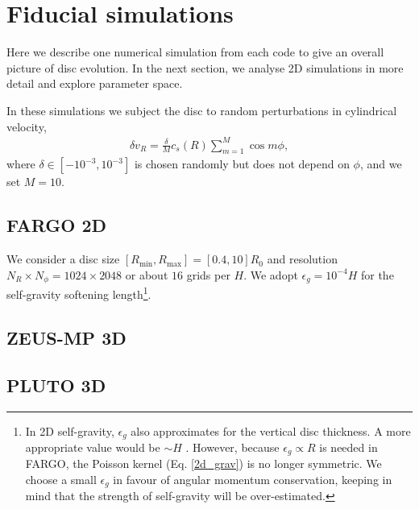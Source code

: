 \section{Fiducial simulations}
Here we describe one numerical simulation from each code to give an
overall picture of disc evolution. In the next section, we analyse 2D
simulations in more detail and explore parameter space. 

In these simulations we subject the disc to random perturbations in
cylindrical velocity,
\begin{align}
  \delta v_R = \frac{\delta}{M}c_s(R)\sum_{m=1}^M\cos{m\phi},
\end{align}
where $\delta\in[-10^{-3},10^{-3}]$ is chosen randomly but does not
depend on $\phi$, and we set $M=10$. 

\subsection{FARGO 2D}
We consider a disc size $[R_\mathrm{min}, R_\mathrm{max}] =
[0.4,10]R_0$ and resolution $N_R\times N_\phi = 1024\times 2048$ or
about $16$ grids per $H$. We adopt $\epsilon_g=10^{-4}H$ for the 
self-gravity softening length\footnote{In 2D self-gravity, $\epsilon_g$ also
approximates for the vertical disc thickness. A more appropriate
value would be $\sim H$ \citep{muller12}. However, because
$\epsilon_g\propto R$ is needed in FARGO, the Poisson kernel
(Eq. \ref{2d_grav}) is no longer symmetric. We choose a
small  
$\epsilon_g$ in favour of angular momentum conservation, keeping in
mind that the strength of self-gravity will be over-estimated.}.

\subsection{ZEUS-MP 3D}





\subsection{PLUTO 3D}
